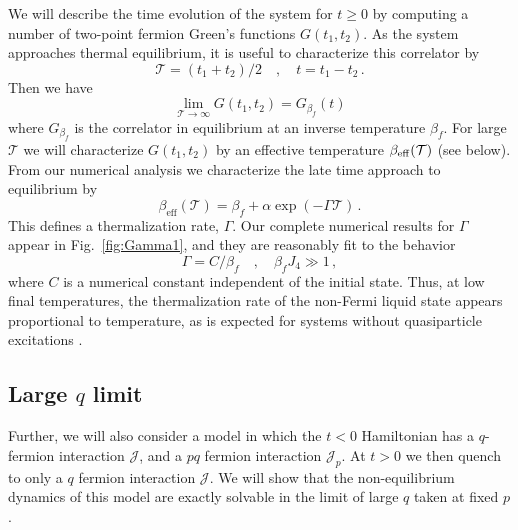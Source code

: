 \documentclass[prx,aps,onecolumn,amsfonts,showpacs,superscriptaddress,preprint,eqsecnum]
{revtex4-1}
\newcommand{\beq}{\begin{equation}}
\newcommand{\eeq}{\end{equation}}
\begin{document}
We will describe the time evolution of the system for $t \geq 0$ by computing a number of two-point
fermion Green's functions $G(t_1, t_2)$. As the system approaches thermal equilibrium, it is useful to characterize
this correlator by 
\beq
\mathcal{T} = (t_1 + t_2)/2 \quad, \quad t = t_1 - t_2 \,. \label{eq:wigner}
\eeq
Then we have
\beq
\lim_{\mathcal{T} \rightarrow \infty} G(t_1, t_2) = G_{\beta_f} (t)
\eeq
where $G_{\beta_f}$ is the correlator in equilibrium at an inverse temperature $\beta_f$. 
For large $\mathcal{T}$ we will characterize $G(t_1, t_2)$ by an effective temperature $\beta_{\rm eff} (\mathcal{T})$ (see below). From our numerical analysis we characterize the late time approach
to equilibrium by
\beq
\beta_\text{eff} (\mathcal{T})  = \beta_f + \alpha \exp \left( - \Gamma \mathcal{T} \right)\,. \label{betaGamma}
\eeq
This defines a thermalization rate, $\Gamma$. Our complete numerical results for $\Gamma$ appear in Fig.~\ref{fig:Gamma1},
and 
they are reasonably fit to the behavior 
\beq
\Gamma = C/\beta_f \quad, \quad \beta_f J_4 \gg 1\,, \label{i6}
\eeq
where $C$ is a numerical constant independent of the initial state. Thus, at low final temperatures, the thermalization rate of the non-Fermi liquid state
appears proportional to temperature, as is expected for systems without quasiparticle excitations \cite{ssbook}.

\subsection{Large $q$ limit}
Further, we will also consider a model in which the $t<0$ Hamiltonian has a $q$-fermion interaction $\mathcal{J}$,
and a $pq$ fermion interaction $\mathcal{J}_p$. At $t>0$ we then quench to only a $q$ fermion
interaction $\mathcal{J}$. We will show that the non-equilibrium dynamics of this model are exactly
solvable in the limit of large $q$ taken at fixed $p$. 
\end{document}
